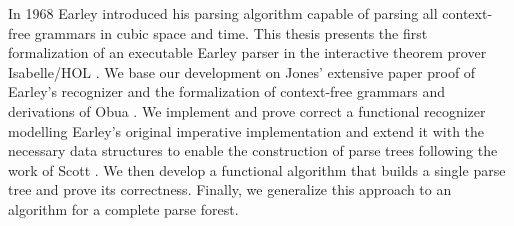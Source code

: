 \documentclass[headsepline,footsepline,footinclude=false,oneside,fontsize=11pt,paper=a4,listof=totoc,bibliography=totoc]{scrbook} %
\begin{document}
In 1968 Earley \cite{Earley:1970} introduced his parsing algorithm capable of parsing all context-free grammars in cubic
space and time. This thesis presents the first formalization of an executable Earley parser in the interactive
theorem prover Isabelle/HOL \cite{Nipkow:2002}. We base our development on Jones' \cite{Jones:1972}
extensive paper proof of Earley's recognizer and the formalization of context-free grammars
and derivations of Obua \cite{Obua:2017}. We implement and prove correct a functional recognizer modelling Earley's
original imperative implementation and extend it with the necessary data structures to enable the construction
of parse trees following the work of Scott \cite{Scott:2008}. We then develop a functional algorithm that
builds a single parse tree and prove its correctness. Finally, we generalize this approach to an algorithm
for a complete parse forest.

\tableofcontents{}

\mainmatter{}




\printbibliography{}
\end{document}
